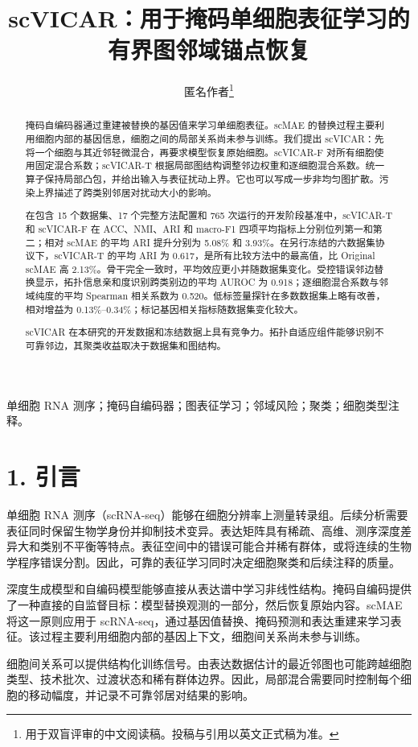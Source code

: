 \documentclass[journal]{IEEEtran}
\title{scVICAR：用于掩码单细胞表征学习的有界图邻域锚点恢复}
\author{匿名作者\thanks{用于双盲评审的中文阅读稿。投稿与引用以英文正式稿为准。}}
\begin{document}
\maketitle

\begin{abstract}
掩码自编码器通过重建被替换的基因值来学习单细胞表征。scMAE 的替换过程主要利用细胞内部的基因信息，细胞之间的局部关系尚未参与训练。我们提出 scVICAR：先将一个细胞与其近邻轻微混合，再要求模型恢复原始细胞。scVICAR-F 对所有细胞使用固定混合系数；scVICAR-T 根据局部图结构调整邻边权重和逐细胞混合系数。统一算子保持局部凸包，并给出输入与表征扰动上界。它也可以写成一步非均匀图扩散。污染上界描述了跨类别邻居对扰动大小的影响。

在包含 15 个数据集、17 个完整方法配置和 765 次运行的开发阶段基准中，scVICAR-T 和 scVICAR-F 在 ACC、NMI、ARI 和 macro-F1 四项平均指标上分别位列第一和第二；相对 scMAE 的平均 ARI 提升分别为 5.08\% 和 3.93\%。在另行冻结的六数据集协议下，scVICAR-T 的平均 ARI 为 0.617，是所有比较方法中的最高值，比 Original scMAE 高 2.13\%。骨干完全一致时，平均效应更小并随数据集变化。受控错误邻边替换显示，拓扑信息亲和度识别跨类别边的平均 AUROC 为 0.918；逐细胞混合系数与邻域纯度的平均 Spearman 相关系数为 0.520。低标签量探针在多数数据集上略有改善，相对增益为 0.13\%–0.34\%；标记基因相关指标随数据集变化较大。

scVICAR 在本研究的开发数据和冻结数据上具有竞争力。拓扑自适应组件能够识别不可靠邻边，其聚类收益取决于数据集和图结构。
\end{abstract}
\begin{IEEEkeywords}
单细胞 RNA 测序；掩码自编码器；图表征学习；邻域风险；聚类；细胞类型注释。
\end{IEEEkeywords}
\section{1. 引言}

单细胞 RNA 测序（scRNA-seq）能够在细胞分辨率上测量转录组。后续分析需要表征同时保留生物学身份并抑制技术变异。表达矩阵具有稀疏、高维、测序深度差异大和类别不平衡等特点。表征空间中的错误可能合并稀有群体，或将连续的生物学程序错误分割。因此，可靠的表征学习同时决定细胞聚类和后续注释的质量。

深度生成模型和自编码模型能够直接从表达谱中学习非线性结构。掩码自编码提供了一种直接的自监督目标：模型替换观测的一部分，然后恢复原始内容。scMAE 将这一原则应用于 scRNA-seq，通过基因值替换、掩码预测和表达重建来学习表征。该过程主要利用细胞内部的基因上下文，细胞间关系尚未参与训练。

细胞间关系可以提供结构化训练信号。由表达数据估计的最近邻图也可能跨越细胞类型、技术批次、过渡状态和稀有群体边界。因此，局部混合需要同时控制每个细胞的移动幅度，并记录不可靠邻居对结果的影响。
\end{document}
